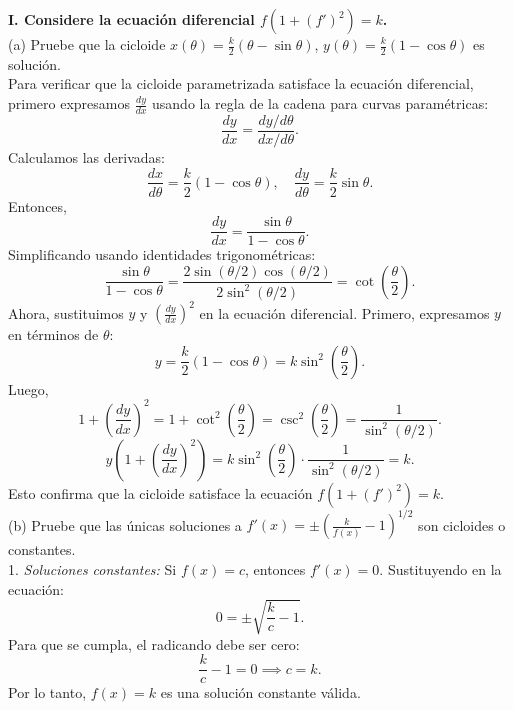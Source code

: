 \documentclass{elsarticle}
\begin{document}
\textbf{I. Considere la ecuación diferencial \( f(1 + (f')^2) = k \).}\\
(a) Pruebe que la cicloide \( x(\theta) = \frac{k}{2}(\theta - \sin\theta) \), \( y(\theta) = \frac{k}{2}(1 - \cos\theta) \) es solución.\\

Para verificar que la cicloide parametrizada satisface la ecuación diferencial, primero expresamos \( \frac{dy}{dx} \) usando la regla de la cadena para curvas paramétricas:  
\[
\frac{dy}{dx} = \frac{dy/d\theta}{dx/d\theta}.
\]  
Calculamos las derivadas:  
\[
\frac{dx}{d\theta} = \frac{k}{2}(1 - \cos\theta), \quad \frac{dy}{d\theta} = \frac{k}{2}\sin\theta.
\]  
Entonces,  
\[
\frac{dy}{dx} = \frac{\sin\theta}{1 - \cos\theta}.
\]  
Simplificando usando identidades trigonométricas:  
\[
\frac{\sin\theta}{1 - \cos\theta} = \frac{2\sin(\theta/2)\cos(\theta/2)}{2\sin^2(\theta/2)} = \cot\left(\frac{\theta}{2}\right).
\]  
Ahora, sustituimos \( y \) y \( \left(\frac{dy}{dx}\right)^2 \) en la ecuación diferencial. Primero, expresamos \( y \) en términos de \( \theta \):  
\[
y = \frac{k}{2}(1 - \cos\theta) = k\sin^2\left(\frac{\theta}{2}\right).
\]  
Luego,  
\[
1 + \left(\frac{dy}{dx}\right)^2 = 1 + \cot^2\left(\frac{\theta}{2}\right) = \csc^2\left(\frac{\theta}{2}\right) = \frac{1}{\sin^2(\theta/2)}.
\]  
\[
y\left(1 + \left(\frac{dy}{dx}\right)^2\right) = k\sin^2\left(\frac{\theta}{2}\right) \cdot \frac{1}{\sin^2(\theta/2)} = k.
\]  
Esto confirma que la cicloide satisface la ecuación \( f(1 + (f')^2) = k \).\\

(b) Pruebe que las únicas soluciones a \( f'(x) = \pm\left(\frac{k}{f(x)} - 1\right)^{1/2} \) son cicloides o constantes.\\

1. \textit{Soluciones constantes:}
   Si \( f(x) = c \), entonces \( f'(x) = 0 \). Sustituyendo en la ecuación:  
   \[
   0 = \pm\sqrt{\frac{k}{c} - 1}.
   \]  
   Para que se cumpla, el radicando debe ser cero:  
   \[
   \frac{k}{c} - 1 = 0 \implies c = k.
   \]  
   Por lo tanto, \( f(x) = k \) es una solución constante válida.  
\end{document}
